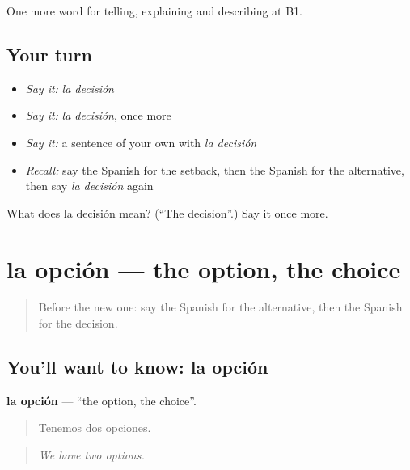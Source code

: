 \begin{grammarlens}[title={What you've built}]
One more word for telling, explaining and describing at B1.
\end{grammarlens}

\subsection*{Your turn}
\begin{itemize}
\raggedright
  \item \emph{Say it:} \emph{la decisión}
  \item \emph{Say it:} \emph{la decisión}, once more
  \item \emph{Say it:} a sentence of your own with \emph{la decisión}
  \item \emph{Recall:} say the Spanish for the setback, then the Spanish for the alternative, then say \emph{la decisión} again
\end{itemize}

\begin{tcolorbox}[breakable,colback=teal!4,colframe=teal!35!black,title={Before you move on}]
What does la decisión mean? (\textquotedblleft{}The decision\textquotedblright{}.) Say it once more.
\end{tcolorbox}
\section[la opción]{la opción — the option, the choice}

\label{lesson:ES-C617-opcion}



\begin{quote}
Before the new one: say the Spanish for the alternative, then the Spanish for the decision.
\end{quote}

\subsection*{You'll want to know: la opción}
\textbf{la opción} — \textquotedblleft{}the option, the choice\textquotedblright{}.

\begin{quote}
Tenemos dos opciones.
\end{quote}

\begin{quote}
\emph{We have two options.}
\end{quote}

